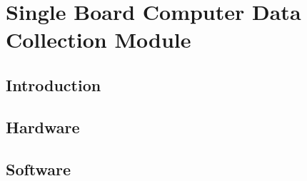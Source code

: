 \chapter{Single Board Computer Data Collection Module}

\section{Introduction}
\section{Hardware}
\section{Software}





%
%

